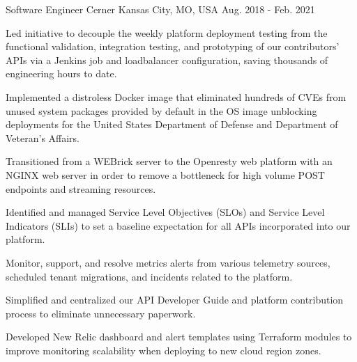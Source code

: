 \begin{cventries}
  \cventry
    {Software Engineer} %
    {Cerner} %
    {Kansas City, MO, USA} %
    {Aug. 2018 - Feb. 2021} %
    {
      \begin{cvitems} %
        \item {Led initiative to decouple the weekly platform deployment testing from the functional validation, integration testing, and prototyping of our contributors' APIs via a Jenkins job and loadbalancer configuration, saving thousands of engineering hours to date.}
        \item {Implemented a distroless Docker image that eliminated hundreds of CVEs from unused system packages provided by default in the OS image unblocking deployments for the United States Department of Defense and Department of Veteran's Affairs.}
        \item {Transitioned from a WEBrick server to the Openresty web platform with an NGINX web server in order to remove a bottleneck for high volume POST endpoints and streaming resources.}
        \item {Identified and managed Service Level Objectives (SLOs) and Service Level Indicators (SLIs) to set a baseline expectation for all APIs incorporated into our platform.}
        \item {Monitor, support, and resolve metrics alerts from various telemetry sources, scheduled tenant migrations, and incidents related to the platform.}
        \item {Simplified and centralized our API Developer Guide and platform contribution process to eliminate unnecessary paperwork.}
        \item {Developed New Relic dashboard and alert templates using Terraform modules to improve monitoring scalability when deploying to new cloud region zones.}
      \end{cvitems}
    }
\end{cventries}

